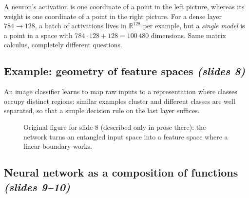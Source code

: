 \documentclass[11pt,a4paper]{article}
\newcommand{\R}{\mathbb{R}}
\newcommand{\slides}[1]{\texorpdfstring{\emph{(slides #1)}}{(slides #1)}}
\theoremstyle{definition}
\theoremstyle{plain}
\begin{document}
\begin{intuition}
A neuron's activation is one coordinate of a point in the left picture, whereas its weight is one coordinate of a point in the right picture. For a dense layer $784\to128$, a batch of activations lives in $\R^{128}$ per example, but a \emph{single model} is a point in a space with $784\cdot128+128 = 100\,480$ dimensions. Same matrix calculus, completely different questions.
\end{intuition}

\subsection{Example: geometry of feature spaces \slides{8}}

An image classifier learns to map raw inputs to a representation where classes occupy distinct regions: similar examples cluster and different classes are well separated, so that a simple decision rule on the last layer suffices.

\begin{figure}[ht]
\centering
{}
\caption{Original figure for slide 8 (described only in prose there): the network turns an entangled input space into a feature space where a linear boundary works.}
\end{figure}

\subsection{Neural network as a composition of functions \slides{9--10}}
\end{document}
